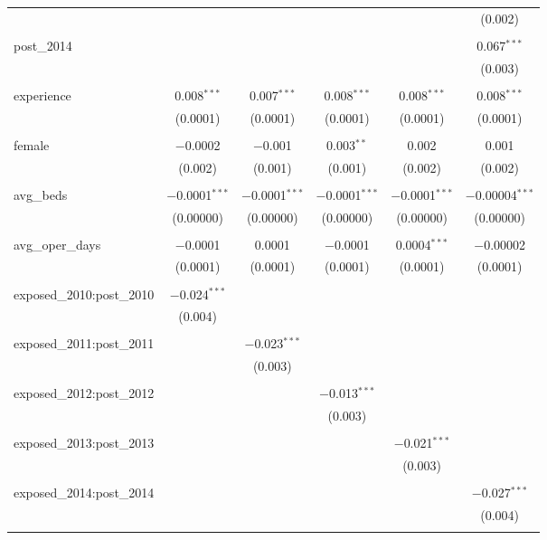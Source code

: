 \begin{table}[!htbp]
\begin{tabular}{@{\extracolsep{5pt}}lccccc}
  &  &  &  &  & (0.002) \\ 
  & & & & & \\ 
 post\_2014 &  &  &  &  & 0.067$^{***}$ \\ 
  &  &  &  &  & (0.003) \\ 
  & & & & & \\ 
 experience & 0.008$^{***}$ & 0.007$^{***}$ & 0.008$^{***}$ & 0.008$^{***}$ & 0.008$^{***}$ \\ 
  & (0.0001) & (0.0001) & (0.0001) & (0.0001) & (0.0001) \\ 
  & & & & & \\ 
 female & $-$0.0002 & $-$0.001 & 0.003$^{**}$ & 0.002 & 0.001 \\ 
  & (0.002) & (0.001) & (0.001) & (0.002) & (0.002) \\ 
  & & & & & \\ 
 avg\_beds & $-$0.0001$^{***}$ & $-$0.0001$^{***}$ & $-$0.0001$^{***}$ & $-$0.0001$^{***}$ & $-$0.00004$^{***}$ \\ 
  & (0.00000) & (0.00000) & (0.00000) & (0.00000) & (0.00000) \\ 
  & & & & & \\ 
 avg\_oper\_days & $-$0.0001 & 0.0001 & $-$0.0001 & 0.0004$^{***}$ & $-$0.00002 \\ 
  & (0.0001) & (0.0001) & (0.0001) & (0.0001) & (0.0001) \\ 
  & & & & & \\ 
 exposed\_2010:post\_2010 & $-$0.024$^{***}$ &  &  &  &  \\ 
  & (0.004) &  &  &  &  \\ 
  & & & & & \\ 
 exposed\_2011:post\_2011 &  & $-$0.023$^{***}$ &  &  &  \\ 
  &  & (0.003) &  &  &  \\ 
  & & & & & \\ 
 exposed\_2012:post\_2012 &  &  & $-$0.013$^{***}$ &  &  \\ 
  &  &  & (0.003) &  &  \\ 
  & & & & & \\ 
 exposed\_2013:post\_2013 &  &  &  & $-$0.021$^{***}$ &  \\ 
  &  &  &  & (0.003) &  \\ 
  & & & & & \\ 
 exposed\_2014:post\_2014 &  &  &  &  & $-$0.027$^{***}$ \\ 
  &  &  &  &  & (0.004) \\ 
  & & & & & \\ 

\end{tabular}
\end{table}

